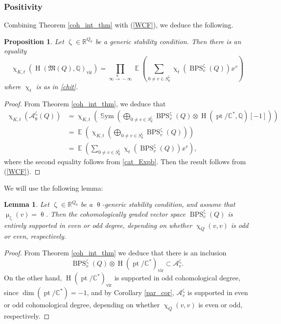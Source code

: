 \documentclass{amsart}
\DeclareMathOperator{\pt}{pt}
\newcommand{\Mst}{\mathfrak{M}}
\DeclareMathOperator{\Sym}{\mathbb{S}ym}
\DeclareMathOperator{\HO}{H}
\DeclareMathOperator{\BPS}{BPS}
\DeclareMathOperator{\vir}{vir}
\DeclareMathOperator{\EE}{\mathbb{E}}
\renewcommand{\theta}{\uptheta}
\renewcommand{\zeta}{\upzeta}
\renewcommand{\chi}{\upchi}
\renewcommand{\mu}{\upmu}
\theoremstyle{plain}%
\newtheorem{lem}[thm]{Lemma}
\newtheorem{prop}[thm]{Proposition}
\theoremstyle{definition}
\theoremstyle{remark}
\begin{document}
\subsubsection{Positivity}
Combining Theorem \ref{coh_int_thm} with (\ref{WCF}), we deduce the following.
\begin{prop}\label{WCF2}
Let $\zeta\in\mathbb{R}^{Q_0}$ be a generic stability condition.  Then there is an equality
\[
\chi_{K,t}(\HO(\Mst(Q),\mathbb{Q})_{\vir})=\prod_{\infty\xrightarrow{\theta} -\infty}\EE\left(\sum_{0\neq v\in S_{\theta}^{\zeta}}\chi_t(\BPS^{\zeta}_v(Q))x^v\right)
\]
where $\chi_t$ is as in \eqref{chit}.
\end{prop}
\begin{proof}
From Theorem \ref{coh_int_thm}, we deduce that
\begin{align} \label{deCatA}
    \chi_{K,t}(\mathcal{A}_{\theta}^{\zeta}(Q))&=  \chi_{K,t}\left(\Sym\left(\bigoplus_{0\neq v\in S_{\theta}^{\zeta}}\BPS_v^{\zeta}(Q)\otimes \HO(\pt/\mathbb{C}^*,\mathbb{Q})[-1]\right)\right) \\ \nonumber
    &=\EE\left(\chi_{K,t}\left(\bigoplus_{0\neq v\in S_{\theta}^{\zeta}}\BPS_v^{\zeta}(Q)\right)\right) \\ \nonumber
    &=\EE\left(\sum_{0\neq v\in S_{\theta}^{\zeta}} \chi_t\left(\BPS_v^{\zeta}(Q)\right)x^v\right),
\end{align}
where the second equality follows from \eqref{cat_Expb}.  Then the result follows from (\ref{WCF}).
\end{proof}
We will use the following lemma:
\begin{lem}\label{BPS_cor}
Let $\zeta\in\mathbb{R}^{Q_0}$ be a $\theta$-generic stability condition, and assume that $\mu_{\zeta}(v)=\theta$.  Then the cohomologically graded vector space $\BPS_v^{\zeta}(Q)$ is entirely supported in even or odd degree, depending on whether $\chi_Q(v,v)$ is odd or even, respectively.
\end{lem}
\begin{proof}
From Theorem \ref{coh_int_thm} we deduce that there is an inclusion
\begin{equation}\label{BPSin}
\BPS_v^{\zeta}(Q)\otimes\HO(\pt/\mathbb{C}^*)_{\vir}\subset \mathcal{A}_{v}^{\zeta}.
\end{equation}
On the other hand, $\HO(\pt/\mathbb{C}^*)_{\vir}$ is supported in odd cohomological degree, since $\dim(\pt/\mathbb{C}^*)=-1$, and by Corollary \ref{par_cor}, $\mathcal{A}_v^{\zeta}$ is supported in even or odd cohomological degree, depending on whether $\chi_Q(v,v)$ is even or odd, respectively.
\end{proof}
\end{document}
